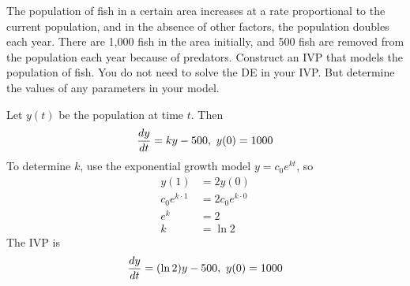 \question[2]{} The population of fish in a certain area increases at a rate proportional to the current population, and in the absence of other factors, the population doubles each year. There are 1,000 fish in the area initially, and 500 fish are removed from the population each year because of predators. Construct an IVP that models the population of fish. You do not need to solve the DE in your IVP. But determine the values of any parameters in your model. 

\ifnum {} {\color{DarkBlue} 
Let $y(t)$ be the population at time $t$. Then 
$${\frac{dy}{dt}} = ky - 500, \ y(0) = 1000$$
To determine $k$, use the exponential growth model $y = c_0e^{kt}$, so 
\begin{align}
    y(1) & = 2y(0) \\
    c_0e^{k\cdot1} &= 2c_0e^{k\cdot0} \\
    e^{k} &= 2 \\
    k &= \ln 2
\end{align}
The IVP is 
$${\frac{dy}{dt}} = (\ln2 )y - 500, \ y(0) = 1000$$
} 
\else 
\fi
\fi


